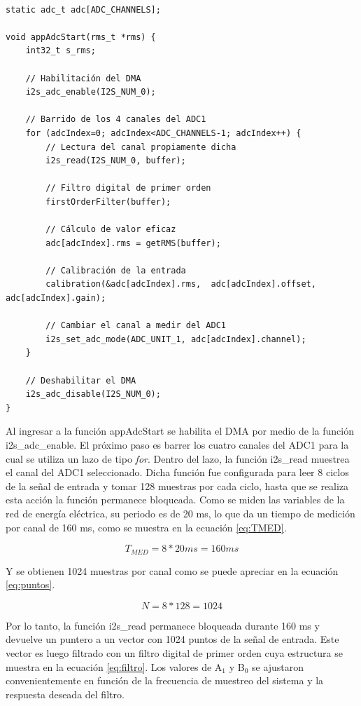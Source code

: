 \begin{lstlisting}[label=cod:adc_c,caption=Pseudocódigo del módulo adc.c.]

static adc_t adc[ADC_CHANNELS];

void appAdcStart(rms_t *rms) {
	int32_t s_rms;
	
	// Habilitación del DMA 
	i2s_adc_enable(I2S_NUM_0);

	// Barrido de los 4 canales del ADC1
	for (adcIndex=0; adcIndex<ADC_CHANNELS-1; adcIndex++) {		
		// Lectura del canal propiamente dicha
		i2s_read(I2S_NUM_0, buffer);
		
		// Filtro digital de primer orden
		firstOrderFilter(buffer);

		// Cálculo de valor eficaz
		adc[adcIndex].rms = getRMS(buffer);
		
		// Calibración de la entrada 
		calibration(&adc[adcIndex].rms,  adc[adcIndex].offset, adc[adcIndex].gain);
		
		// Cambiar el canal a medir del ADC1
		i2s_set_adc_mode(ADC_UNIT_1, adc[adcIndex].channel);
	}
	
	// Deshabilitar el DMA
	i2s_adc_disable(I2S_NUM_0);
}
\end{lstlisting}

Al ingresar a la función appAdcStart se habilita el DMA por medio de la función i2s\_adc\_enable. El próximo paso es barrer los cuatro canales del ADC1 para la cual se utiliza un lazo de tipo \textit{for}. Dentro del lazo, la función i2s\_read muestrea el canal del ADC1 seleccionado. Dicha función fue configurada para leer 8 ciclos de la señal de entrada y tomar 128 muestras por cada ciclo, hasta que se realiza esta acción la función permanece bloqueada. Como se miden las variables de la red de energía eléctrica, su periodo es de 20 ms, lo que da un tiempo de medición por canal de 160 ms, como se muestra en la ecuación \ref{eq:TMED}.

\begin{equation}
	\label{eq:TMED}
	T_{MED} = 8 * 20 ms = 160 ms
\end{equation}

Y se obtienen 1024 muestras por canal como se puede apreciar en la ecuación \ref{eq:puntos}.

\begin{equation}
	\label{eq:puntos}
	N = 8 * 128 = 1024
\end{equation}

Por lo tanto, la función i2s\_read permanece bloqueada durante 160 ms y devuelve un puntero a un vector con 1024 puntos de la señal de entrada. Este vector es luego filtrado con un filtro digital de primer orden cuya estructura se muestra en la ecuación \ref{eq:filtro}. Los valores de A$_{1}$ y B$_{0}$ se ajustaron convenientemente en función de la frecuencia de muestreo del sistema y la respuesta deseada del filtro.

